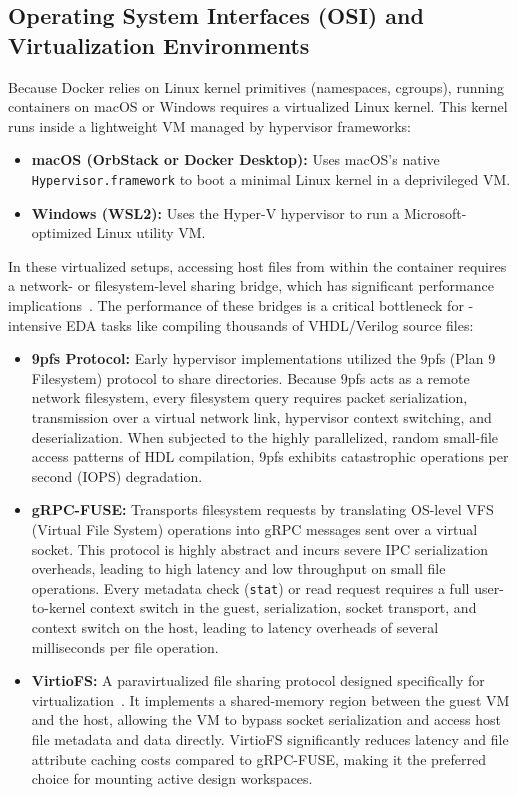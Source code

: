 \subsection{Operating System Interfaces (OSI) and Virtualization Environments}
Because Docker relies on Linux kernel primitives (namespaces, cgroups), running containers on macOS or Windows requires a virtualized Linux kernel. This kernel runs inside a lightweight VM managed by hypervisor frameworks:
\begin{itemize}
    \item \textbf{macOS (OrbStack or Docker Desktop):} Uses macOS's native \texttt{Hypervisor.framework} to boot a minimal Linux kernel in a deprivileged VM.
    \item \textbf{Windows (WSL2):} Uses the Hyper-V hypervisor to run a Microsoft-optimized Linux utility VM.
\end{itemize}
In these virtualized setups, accessing host files from within the container requires a network- or filesystem-level sharing bridge, which has significant performance implications~\cite{dockerio}. The performance of these bridges is a critical bottleneck for -intensive EDA tasks like compiling thousands of VHDL/Verilog source files:
\begin{itemize}
    \item \textbf{9pfs Protocol:} Early hypervisor implementations utilized the 9pfs (Plan 9 Filesystem) protocol to share directories. Because 9pfs acts as a remote network filesystem, every filesystem query requires packet serialization, transmission over a virtual network link, hypervisor context switching, and deserialization. When subjected to the highly parallelized, random small-file access patterns of HDL compilation, 9pfs exhibits catastrophic  operations per second (IOPS) degradation.
    \item \textbf{gRPC-FUSE:} Transports filesystem requests by translating OS-level VFS (Virtual File System) operations into gRPC messages sent over a virtual socket. This protocol is highly abstract and incurs severe IPC serialization overheads, leading to high latency and low throughput on small file operations. Every metadata check (\texttt{stat}) or read request requires a full user-to-kernel context switch in the guest, serialization, socket transport, and context switch on the host, leading to latency overheads of several milliseconds per file operation.
    \item \textbf{VirtioFS:} A paravirtualized file sharing protocol designed specifically for virtualization~\cite{russell2008virtio}. It implements a shared-memory region between the guest VM and the host, allowing the VM to bypass socket serialization and access host file metadata and data directly. VirtioFS significantly reduces latency and file attribute caching costs compared to gRPC-FUSE, making it the preferred choice for mounting active design workspaces.
\end{itemize}
